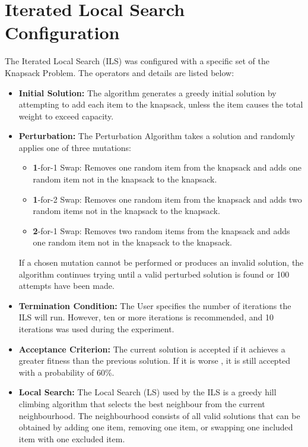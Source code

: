 \documentclass{article}
\begin{document}
\section{Iterated Local Search Configuration}

The Iterated Local Search (ILS) was configured with a specific set of the Knapsack Problem. The operators and details are listed below:

\begin{itemize}
    \item \textbf{Initial Solution:} The algorithm generates a greedy initial solution by attempting to add each item to the knapsack, unless the item causes the total weight to exceed capacity.
    \item \textbf{Perturbation:} The Perturbation Algorithm takes a solution and randomly applies one of three mutations:
    \begin{itemize}
        \item \textbf 1-for-1 Swap: Removes one random item from the knapsack and adds one random item not in the knapsack to the knapsack.
        \item \textbf 1-for-2 Swap: Removes one random item from the knapsack and adds two random items not in the knapsack to the knapsack.
        \item \textbf 2-for-1 Swap: Removes two random items from the knapsack and adds one random item not in the knapsack to the knapsack.
    \end{itemize}
    If a chosen mutation cannot be performed or produces an invalid solution, the algorithm continues trying until a valid perturbed solution is found or 100 attempts have been made.
    \item \textbf{Termination Condition:} The User specifies the number of iterations the ILS will run. However, ten or more iterations is recommended, and 10 iterations was used during the experiment.
    \item \textbf{Acceptance Criterion:} The current solution is accepted if it achieves a greater fitness than the previous solution. If it is worse , it is still accepted with a probability of 60\%.
    \item \textbf{Local Search:} The Local Search (LS) used by the ILS is a greedy hill climbing algorithm that selects the best neighbour from the current neighbourhood. The neighbourhood consists of all valid solutions that can be obtained by adding one item, removing one item, or swapping one included item with one excluded item.
\end{itemize}
\end{document}
